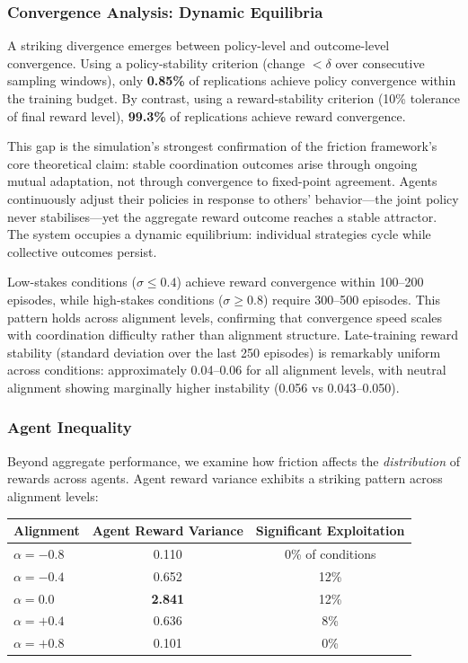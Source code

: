 \subsubsection{Convergence Analysis: Dynamic Equilibria}

A striking divergence emerges between policy-level and outcome-level convergence. Using a policy-stability criterion (change $< \delta$ over consecutive sampling windows), only \textbf{0.85\%} of replications achieve policy convergence within the training budget. By contrast, using a reward-stability criterion (10\% tolerance of final reward level), \textbf{99.3\%} of replications achieve reward convergence.

This gap is the simulation's strongest confirmation of the friction framework's core theoretical claim: stable coordination outcomes arise through ongoing mutual adaptation, not through convergence to fixed-point agreement. Agents continuously adjust their policies in response to others' behavior---the joint policy never stabilises---yet the aggregate reward outcome reaches a stable attractor. The system occupies a dynamic equilibrium: individual strategies cycle while collective outcomes persist.

Low-stakes conditions ($\sigma \leq 0.4$) achieve reward convergence within 100--200 episodes, while high-stakes conditions ($\sigma \geq 0.8$) require 300--500 episodes. This pattern holds across alignment levels, confirming that convergence speed scales with coordination difficulty rather than alignment structure. Late-training reward stability (standard deviation over the last 250 episodes) is remarkably uniform across conditions: approximately 0.04--0.06 for all alignment levels, with neutral alignment showing marginally higher instability (0.056 vs 0.043--0.050).

\subsubsection{Agent Inequality}

Beyond aggregate performance, we examine how friction affects the \emph{distribution} of rewards across agents. Agent reward variance exhibits a striking pattern across alignment levels:

\begin{center}
\begin{tabular}{@{}lcc@{}}
\toprule
\textbf{Alignment} & \textbf{Agent Reward Variance} & \textbf{Significant Exploitation} \\
\midrule
$\alpha = -0.8$ & 0.110 & 0\% of conditions \\
$\alpha = -0.4$ & 0.652 & 12\% \\
$\alpha = 0.0$ & \textbf{2.841} & 12\% \\
$\alpha = +0.4$ & 0.636 & 8\% \\
$\alpha = +0.8$ & 0.101 & 0\% \\
\bottomrule
\end{tabular}
\end{center}

